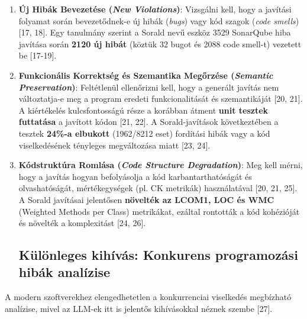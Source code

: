 \begin{enumerate}
    \item \textbf{Új Hibák Bevezetése (\emph{New Violations})}:
    Vizsgálni kell, hogy a javítási folyamat során bevezetődnek-e új hibák (\emph{bugs}) vagy kód szagok (\emph{code smells}) [17, 18]. Egy tanulmány szerint a Sorald nevű eszköz 3529 SonarQube hiba javítása során \textbf{2120 új hibát} (köztük 32 bugot és 2088 code smell-t) vezetett be [17-19].

    \item \textbf{Funkcionális Korrektség és Szemantika Megőrzése (\emph{Semantic Preservation})}:
    Feltétlenül ellenőrizni kell, hogy a generált javítás nem változtatja-e meg a program eredeti funkcionalitását és szemantikáját [20, 21]. A kiértékelés kulcsfontosságú része a korábban átment \textbf{unit tesztek futtatása} a javított kódon [21, 22]. A Sorald-javítások következtében a tesztek \textbf{24\%-a elbukott} (1962/8212 eset) fordítási hibák vagy a kód viselkedésének tényleges megváltozása miatt [23, 24].

    \item \textbf{Kódstruktúra Romlása (\emph{Code Structure Degradation})}:
    Meg kell mérni, hogy a javítás hogyan befolyásolja a kód karbantarthatóságát és olvashatóságát, mértékegységek (pl. CK metrikák) használatával [20, 21, 25]. A Sorald javításai jelentősen \textbf{növelték az LCOM1, LOC és WMC} (Weighted Methods per Class) metrikákat, ezáltal rontották a kód kohézióját és növelték a komplexitást [24, 26].

\subsection{Különleges kihívás: Konkurens programozási hibák analízise}
\label{ssec:concurrency}
\end{enumerate}

A modern szoftverekhez elengedhetetlen a konkurrenciai viselkedés megbízható analízise, mivel az LLM-ek itt is jelentős kihívásokkal néznek szembe [27].

